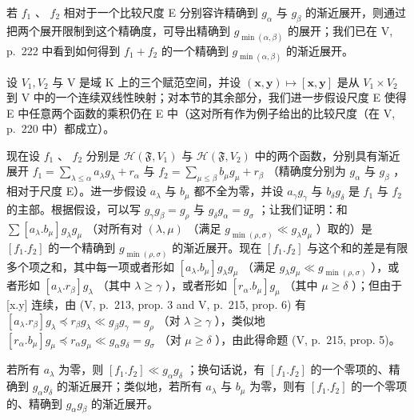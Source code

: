 若 \(f_{1}\) 、 \(f_{2}\) 相对于一个比较尺度 E 分别容许精确到 \(g_{\alpha}\) 与 \(g_{\beta}\) 的渐近展开，则通过把两个展开限制到这个精确度，可导出精确到 \(g_{\min(\alpha,\beta)}\) 的展开；我们已在 V, p.~222 中看到如何得到 \(f_{1} + f_{2}\) 的一个精确到 \(g_{\min(\alpha,\beta)}\) 的渐近展开。

设 \(V_{1}, V_{2}\) 与 V 是域 K 上的三个赋范空间，并设 \((\mathbf{x}, \mathbf{y}) \mapsto [\mathbf{x}, \mathbf{y}]\) 是从 \(V_{1} \times V_{2}\) 到 V 中的一个连续双线性映射；对本节的其余部分，我们进一步假设尺度 E 使得 E 中任意两个函数的乘积仍在 E 中（这对所有作为例子给出的比较尺度（在 V, p.~220 中）都成立）。

现在设 \(f_{1}\) 、 \(f_{2}\) 分别是 \(\mathcal{H}(\mathfrak{F}, V_{1})\) 与 \(\mathcal{H}(\mathfrak{F}, V_{2})\) 中的两个函数，分别具有渐近展开 \(f_{1} = \sum_{\lambda \leqslant \alpha} a_{\lambda} g_{\lambda} + r_{\alpha}\) 与 \(f_{2} = \sum_{\mu \leqslant \beta} b_{\mu} g_{\mu} + r_{\beta}\) （精确度分别为 \(g_{\alpha}\) 与 \(g_{\beta}\) ，相对于尺度 E）。进一步假设 \(a_{\lambda}\) 与 \(b_{\mu}\) 都不全为零，并设 \(a_{\gamma} g_{\gamma}\) 与 \(b_{\delta} g_{\delta}\) 是 \(f_{1}\) 与 \(f_{2}\) 的主部。根据假设，可以写 \(g_{\gamma} g_{\beta} = g_{\rho}\) 与 \(g_{\delta} g_{\alpha} = g_{\sigma}\) ；让我们证明：和 \(\sum[a_{\lambda}.b_{\mu}]g_{\lambda}g_{\mu}\) （对所有对 \((\lambda,\mu)\) （满足 \(g_{\min(\rho,\sigma)}\ll g_{\lambda}g_{\mu}\) ）取的）是 \([f_{1}.f_{2}]\) 的一个精确到 \(g_{\min(\rho,\sigma)}\) 的渐近展开。现在 \([f_{1}.f_{2}]\) 与这个和的差是有限多个项之和，其中每一项或者形如 \([a_{\lambda}.b_{\mu}]g_{\lambda}g_{\mu}\) （满足 \(g_{\lambda}g_{\mu}\ll g_{\min(\rho,\sigma)}\) ），或者形如 \([a_{\lambda}.r_{\beta}]g_{\lambda}\) （其中 \(\lambda\geqslant\gamma\) ），或者形如 \([r_{\alpha}.b_{\mu}]g_{\mu}\) （其中 \(\mu\geqslant\delta\) ）；但由于 {[}x.y{]} 连续，由 (V, p.~213, prop. 3 and V, p.~215, prop. 6) 有 \([a_{\lambda}.r_{\beta}]g_{\lambda}\preccurlyeq r_{\beta}g_{\lambda}\ll g_{\beta}g_{\gamma}=g_{\rho}\) （对 \(\lambda\geqslant\gamma\) ），类似地 \([r_{\alpha}.b_{\mu}]g_{\mu}\preccurlyeq r_{\alpha}g_{\mu}\ll g_{\alpha}g_{\delta}=g_{\sigma}\) （对 \(\mu\geqslant\delta\) ），由此得命题 (V, p.~215, prop. 5)。

若所有 \(a_{\lambda}\) 为零，则 \([f_{1}.f_{2}] \ll g_{\alpha}g_{\delta}\) ；换句话说，有 \([f_{1}.f_{2}]\) 的一个零项的、精确到 \(g_{\alpha}g_{\delta}\) 的渐近展开；类似地，若所有 \(a_{\lambda}\) 与 \(b_{\mu}\) 为零，则有 \([f_{1}.f_{2}]\) 的一个零项的、精确到 \(g_{\alpha}g_{\beta}\) 的渐近展开。

